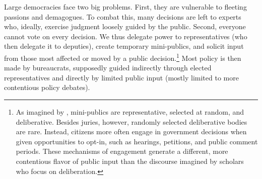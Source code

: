 
Large democracies face two big problems. First, they are vulnerable to fleeting passions and demagogues. To combat this, many decisions are left to experts who, ideally, %
exercise judgment loosely guided by the public. Second, everyone cannot vote on every decision. We thus delegate power to representatives (who then delegate it to deputies), create temporary mini-publics, and solicit input from those most affected or moved by a public decision.\footnote{
As imagined by \citet{Dahl1989}, mini-publics are representative, selected at random, and deliberative. Besides juries, however, randomly selected deliberative bodies are rare. Instead, citizens more often engage in government decisions when given opportunities to opt-in, such as hearings, petitions, and public comment periods. These mechanisms of engagement generate a different, more contentious flavor of public input than the discourse imagined by scholars who focus on deliberation.
}
Most policy is then made by bureaucrats, supposedly guided indirectly through elected representatives and directly by limited public input (mostly limited to more contentious policy debates).




